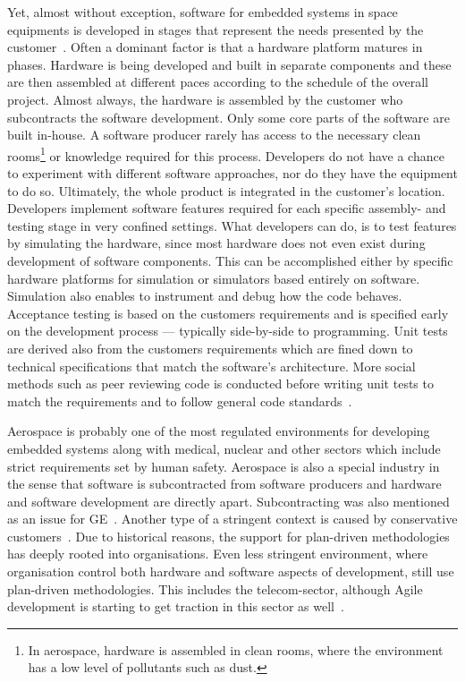 \documentclass[english]{tktltiki2}
\begin{document}
Yet, almost without exception, software for embedded systems in space equipments is developed in stages that represent the needs presented by the customer~\cite{Hol15b}. Often a dominant factor is that a hardware platform matures in phases. Hardware is being developed and built in separate components and these are then assembled at different paces according to the schedule of the overall project. Almost always, the hardware is assembled by the customer who subcontracts the software development. Only some core parts of the software are built in-house. A software producer rarely has access to the necessary clean rooms\footnote{In aerospace, hardware is assembled in clean rooms, where the environment has a low level of pollutants such as dust.} or knowledge required for this process. Developers do not have a chance to experiment with different software approaches, nor do they have the equipment to do so. Ultimately, the whole product is integrated in the customer’s location. Developers implement software features required for each specific assembly- and testing stage in very confined settings. What developers can do, is to test features by simulating the hardware, since most hardware does not even exist during development of software components. This can be accomplished either by specific hardware platforms for simulation or simulators based entirely on software. Simulation also enables to instrument and debug how the code behaves. Acceptance testing is based on the customers requirements and is specified early on the development process — typically side-by-side to programming. Unit tests are derived also from the customers requirements which are fined down to technical specifications that match the software’s architecture. More social methods such as peer reviewing code is conducted before writing unit tests to match the requirements and to follow general code standards~\cite{Hol15b}.

Aerospace is probably one of the most regulated environments for developing embedded systems along with medical, nuclear and other sectors which include strict requirements set by human safety. Aerospace is also a special industry in the sense that software is subcontracted from software producers and hardware and software development are directly apart. Subcontracting was also mentioned as an issue for GE~\cite{BT15}. Another type of a stringent context is caused by conservative customers~\cite{Koi15}. Due to historical reasons, the support for plan-driven methodologies has deeply rooted into organisations. Even less stringent environment, where organisation control both hardware and software aspects of development, still use plan-driven methodologies. This includes the telecom-sector, although Agile development is starting to get traction in this sector as well~\cite{LTR14, Koi15}.
\end{document}
